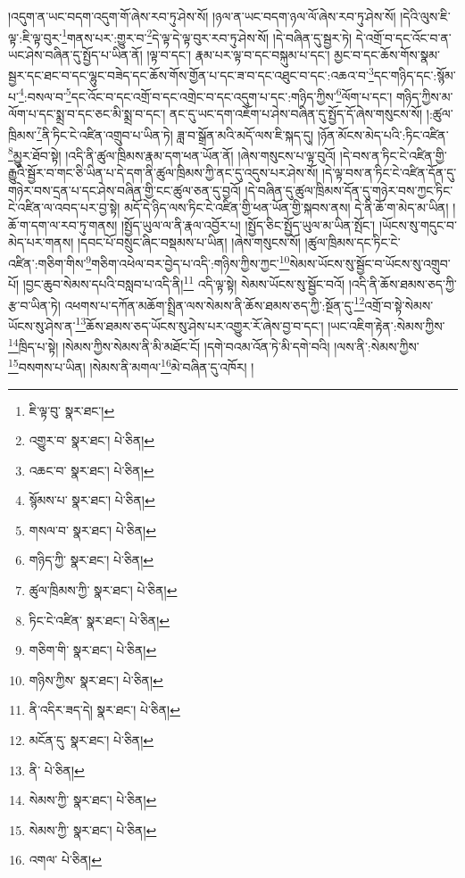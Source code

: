 །འདུག་ན་ཡང་བདག་འདུག་གོ་ཞེས་རབ་ཏུ་ཤེས་སོ། །ཉལ་ན་ཡང་བདག་ཉལ་ལོ་ཞེས་རབ་ཏུ་ཤེས་སོ། །དེའི་ལུས་ཇི་ལྟ་:ཇི་ལྟ་བུར་\footnote{ཇི་ལྟ་བུ་  སྣར་ཐང་། }གནས་པར་:གྱུར་བ་\footnote{འགྱུར་བ་  སྣར་ཐང་།  པེ་ཅིན། }དེ་ལྟ་དེ་ལྟ་བུར་རབ་ཏུ་ཤེས་སོ། །དེ་བཞིན་དུ་སྦྱར་ཏེ། དེ་འགྲོ་བ་དང་འོང་བ་ན་ཡང་ཤེས་བཞིན་དུ་སྤྱོད་པ་ཡིན་ནོ། །ལྟ་བ་དང་། རྣམ་པར་ལྟ་བ་དང་བསྐུམ་པ་དང་། མྱང་བ་དང་ཆོས་གོས་སྣམ་སྦྱར་དང་ཐང་བ་དང་ལྷུང་བཟེད་དང་ཆོས་གོས་གྱོན་པ་དང་ཟ་བ་དང་འཐུང་བ་དང་:འཆའ་བ་\footnote{འཆང་བ་  སྣར་ཐང་།  པེ་ཅིན། }དང་གཉིད་དང་:སྙོམ་པ་\footnote{སྙོམས་པ་  སྣར་ཐང་།  པེ་ཅིན། }:བསལ་བ་\footnote{གསལ་བ་  སྣར་ཐང་།  པེ་ཅིན། }དང་འོང་བ་དང་འགྲོ་བ་དང་འགྲེང་བ་དང་འདུག་པ་དང་:གཉིད་ཀྱིས་\footnote{གཉིད་ཀྱི་  སྣར་ཐང་།  པེ་ཅིན། }ལོག་པ་དང་། གཉིད་ཀྱིས་མ་ལོག་པ་དང་སྨྲ་བ་དང་ཅང་མི་སྨྲ་བ་དང་། ནང་དུ་ཡང་དག་འཇོག་པ་ཤེས་བཞིན་དུ་སྤྱོད་དོ་ཞེས་གསུངས་སོ། །:ཚུལ་ཁྲིམས་\footnote{ཚུལ་ཁྲིམས་ཀྱི་  སྣར་ཐང་།  པེ་ཅིན། }ནི་ཏིང་ངེ་འཛིན་འགྲུབ་པ་ཡིན་ཏེ། ཟླ་བ་སྒྲོན་མའི་མདོ་ལས་ཇི་སྐད་དུ། །ཉོན་མོངས་མེད་པའི་:ཏིང་འཛིན་\footnote{ཏིང་ངེ་འཛིན་  སྣར་ཐང་།  པེ་ཅིན། }མྱུར་ཐོབ་སྟེ། །འདི་ནི་ཚུལ་ཁྲིམས་རྣམ་དག་ཕན་ཡོན་ནོ། །ཞེས་གསུངས་པ་ལྟ་བུའོ། །དེ་བས་ན་ཏིང་ངེ་འཛིན་གྱི་རྒྱུའི་སྦྱོར་བ་གང་ཅི་ཡིན་པ་དེ་དག་ནི་ཚུལ་ཁྲིམས་ཀྱི་ནང་དུ་འདུས་པར་ཤེས་སོ། །དེ་ལྟ་བས་ན་ཏིང་ངེ་འཛིན་དོན་དུ་གཉེར་བས་དྲན་པ་དང་ཤེས་བཞིན་གྱི་ངང་ཚུལ་ཅན་དུ་བྱའོ། །དེ་བཞིན་དུ་ཚུལ་ཁྲིམས་དོན་དུ་གཉེར་བས་ཀྱང་ཏིང་ངེ་འཛིན་ལ་འབད་པར་བྱ་སྟེ། མདོ་དེ་ཉིད་ལས་ཏིང་ངེ་འཛིན་གྱི་ཕན་ཡོན་གྱི་སྐབས་ནས། དེ་ནི་ཆོ་ག་མེད་མ་ཡིན། །ཆོ་ག་དག་ལ་རབ་ཏུ་གནས། །སྤྱོད་ཡུལ་ལ་ནི་རྣལ་འབྱོར་པ། །སྤྱོད་ཅིང་སྤྱོད་ཡུལ་མ་ཡིན་སྤོང་། །ཡོངས་སུ་གདུང་བ་མེད་པར་གནས། །དབང་པོ་བསྲུང་ཞིང་བསྡམས་པ་ཡིན། །ཞེས་གསུངས་སོ། །ཚུལ་ཁྲིམས་དང་ཏིང་ངེ་འཛིན་:གཅིག་གིས་\footnote{གཅིག་གི་  སྣར་ཐང་།  པེ་ཅིན། }གཅིག་འཕེལ་བར་བྱེད་པ་འདི་:གཉིས་ཀྱིས་ཀྱང་\footnote{གཉིས་ཀྱིས་  སྣར་ཐང་།  པེ་ཅིན། }སེམས་ཡོངས་སུ་སྦྱོང་བ་ཡོངས་སུ་འགྲུབ་པོ། །བྱང་ཆུབ་སེམས་དཔའི་བསླབ་པ་འདི་ནི།\footnote{ནི་འདིར་ཟད་དེ།  སྣར་ཐང་།  པེ་ཅིན། } འདི་ལྟ་སྟེ། སེམས་ཡོངས་སུ་སྦྱོང་བའོ། །འདི་ནི་ཆོས་ཐམས་ཅད་ཀྱི་རྩ་བ་ཡིན་ཏེ། འཕགས་པ་དཀོན་མཆོག་སྤྲིན་ལས་སེམས་ནི་ཆོས་ཐམས་ཅད་ཀྱི་:སྔོན་དུ་\footnote{མངོན་དུ་  སྣར་ཐང་།  པེ་ཅིན། }འགྲོ་བ་སྟེ་སེམས་ཡོངས་སུ་ཤེས་ན་\footnote{ནི་  པེ་ཅིན། }ཆོས་ཐམས་ཅད་ཡོངས་སུ་ཤེས་པར་འགྱུར་རོ་ཞེས་བྱ་བ་དང་། །ཡང་འཇིག་རྟེན་:སེམས་ཀྱིས་\footnote{སེམས་ཀྱི་  སྣར་ཐང་།  པེ་ཅིན། }ཁྲིད་པ་སྟེ། །སེམས་ཀྱིས་སེམས་ནི་མི་མཐོང་ངོ། །དགེ་བའམ་འོན་ཏེ་མི་དགེ་བའི། །ལས་ནི་:སེམས་ཀྱིས་\footnote{སེམས་ཀྱི་  སྣར་ཐང་།  པེ་ཅིན། }བསགས་པ་ཡིན། །སེམས་ནི་མགལ་\footnote{འགལ་  པེ་ཅིན། }མེ་བཞིན་དུ་འཁོར། །
